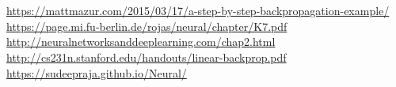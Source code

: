 \documentclass{article}
\begin{document}
\\
\\
\begin{thebibliography}{9}

%
\url{https://mattmazur.com/2015/03/17/a-step-by-step-backpropagation-example/}
\\
\url{https://page.mi.fu-berlin.de/rojas/neural/chapter/K7.pdf}
\\
\url{http://neuralnetworksanddeeplearning.com/chap2.html}
\\
\url{http://cs231n.stanford.edu/handouts/linear-backprop.pdf}
\\
\url{https://sudeepraja.github.io/Neural/}
\\
\end{thebibliography}
\end{document}
